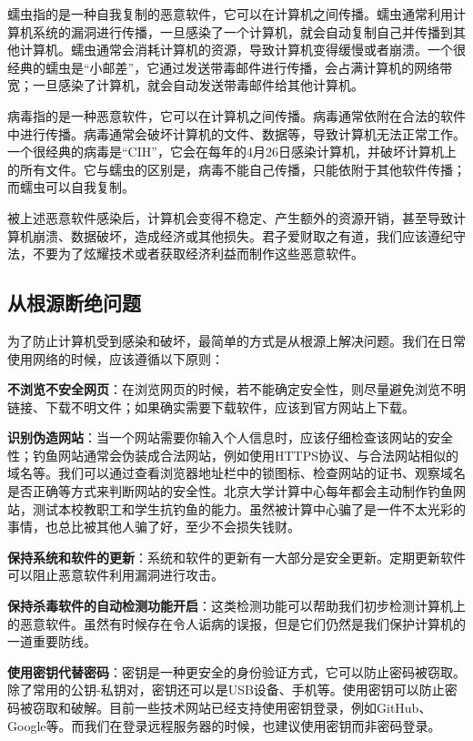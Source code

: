 蠕虫指的是一种自我复制的恶意软件，它可以在计算机之间传播。蠕虫通常利用计算机系统的漏洞进行传播，一旦感染了一个计算机，就会自动复制自己并传播到其他计算机。蠕虫通常会消耗计算机的资源，导致计算机变得缓慢或者崩溃。一个很经典的蠕虫是“小邮差”，它通过发送带毒邮件进行传播，会占满计算机的网络带宽；一旦感染了计算机，就会自动发送带毒邮件给其他计算机。

病毒指的是一种恶意软件，它可以在计算机之间传播。病毒通常依附在合法的软件中进行传播。病毒通常会破坏计算机的文件、数据等，导致计算机无法正常工作。一个很经典的病毒是“CIH”，它会在每年的4月26日感染计算机，并破坏计算机上的所有文件。它与蠕虫的区别是，病毒不能自己传播，只能依附于其他软件传播；而蠕虫可以自我复制。

被上述恶意软件感染后，计算机会变得不稳定、产生额外的资源开销，甚至导致计算机崩溃、数据破坏，造成经济或其他损失。君子爱财取之有道，我们应该遵纪守法，不要为了炫耀技术或者获取经济利益而制作这些恶意软件。

\subsection{从根源断绝问题}

为了防止计算机受到感染和破坏，最简单的方式是从根源上解决问题。我们在日常使用网络的时候，应该遵循以下原则：

\textbf{不浏览不安全网页}：在浏览网页的时候，若不能确定安全性，则尽量避免浏览不明链接、下载不明文件；如果确实需要下载软件，应该到官方网站上下载。

\textbf{识别伪造网站}：当一个网站需要你输入个人信息时，应该仔细检查该网站的安全性；钓鱼网站通常会伪装成合法网站，例如使用HTTPS协议、与合法网站相似的域名等。我们可以通过查看浏览器地址栏中的锁图标、检查网站的证书、观察域名是否正确等方式来判断网站的安全性。北京大学计算中心每年都会主动制作钓鱼网站，测试本校教职工和学生抗钓鱼的能力。虽然被计算中心骗了是一件不太光彩的事情，也总比被其他人骗了好，至少不会损失钱财。

\textbf{保持系统和软件的更新}：系统和软件的更新有一大部分是安全更新。定期更新软件可以阻止恶意软件利用漏洞进行攻击。

\textbf{保持杀毒软件的自动检测功能开启}：这类检测功能可以帮助我们初步检测计算机上的恶意软件。虽然有时候存在令人诟病的误报，但是它们仍然是我们保护计算机的一道重要防线。

\textbf{使用密钥代替密码}：密钥是一种更安全的身份验证方式，它可以防止密码被窃取。除了常用的公钥-私钥对，密钥还可以是USB设备、手机等。使用密钥可以防止密码被窃取和破解。目前一些技术网站已经支持使用密钥登录，例如GitHub、Google等。而我们在登录远程服务器的时候，也建议使用密钥而非密码登录。

